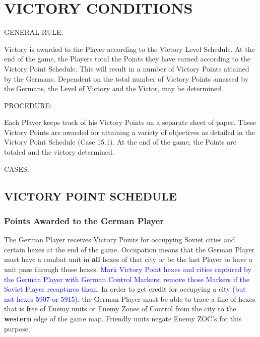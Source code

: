 \section{VICTORY CONDITIONS}

GENERAL RULE:

Victory is awarded to the Player according to the Victory Level Schedule. At the end of the game, the Players total the Points they have earned according to the Victory Point Schedule. This will result in a number of Victory Points attained by the Germans. Dependent on the total number of Victory Points amassed by the Germans, the Level of Victory and the Victor, may be determined.

PROCEDURE:

Each Player keeps track of his Victory Points on a separate sheet of paper. These Victory Points are awarded for attaining a variety of objectives as detailed in the Victory Point Schedule (Case 15.1). At the end of the game, the Points are totaled and the victory determined.

CASES:

\subsection{VICTORY POINT SCHEDULE}

\subsubsection{Points Awarded to the German Player}

The German Player receives Victory Points for occupying Soviet cities and certain hexes at the end of the game. Occupation means that the German Player must have a combat unit in \textbf{all} hexes of that city or be the last Player to have a unit pass through those hexes. \textcolor{blue}{Mark Victory Point hexes and cities captured by the German Player with German Control Markers; remove those Markers if the Soviet Player recaptures them.} In order to get credit for occupying a city \textcolor{blue}{(but not hexes 5907 or 5915)}, the German Player must be able to trace a line of hexes that is free of Enemy units or Enemy Zones of Control from the city to the \textbf{western} edge of the game map. Friendly units negate Enemy ZOC's for this purpose.

